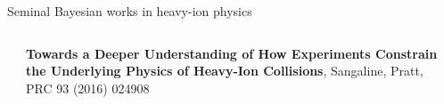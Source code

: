 \documentclass{beamer}
\begin{document}
\begin{frame}{Seminal Bayesian works in heavy-ion physics}
\begin{columns}[T]
\begin{column}{0.05\textwidth}
    \end{column}
    \begin{column}{0.9\textwidth}
      \scriptsize {}
      \textbf{Towards a Deeper Understanding of How Experiments Constrain the Underlying Physics of Heavy-Ion Collisions}, Sangaline, Pratt, PRC 93 (2016) 024908
    \end{column}
    \begin{column}{0.025\textwidth}
    \end{column}
  \end{columns}

\end{frame}
\end{document}

